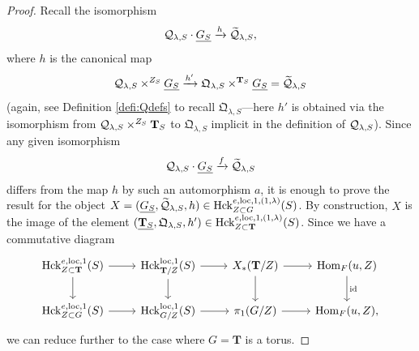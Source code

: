 \begin{proof}
Recall the isomorphism 
\begin{equation*}
    \mathcal{Q}_{\lambda,S} \cdot \underline{G_{S}} \xrightarrow{h} \widetilde{\mathcal{Q}}_{\lambda,S},
\end{equation*}
where $h$ is the canonical map 
\begin{equation*}
     \mathcal{Q}_{\lambda,S} \times^{Z_{S}} \underline{G_{S}} \xrightarrow{h'} \mathfrak{Q}_{\lambda,S} \times^{\mathbf{T}_{S}} \underline{G_{S}} = \widetilde{\mathcal{Q}}_{\lambda,S}
\end{equation*}
(again, see Definition \ref{defi:Qdefs} to recall $\mathfrak{Q}_{\lambda,S}$---here $h'$ is obtained via the isomorphism from $\mathcal{Q}_{\lambda,S} \times^{Z_{S}} \mathbf{T}_{S}$ to $\mathfrak{Q}_{\lambda,S}$ implicit in the definition of $\mathcal{Q}_{\lambda,S}$). Since any given isomorphism
\begin{equation*}
    \mathcal{Q}_{\lambda,S} \cdot \underline{G_{S}} \xrightarrow{f} \widetilde{\mathcal{Q}}_{\lambda,S}
\end{equation*}
differs from the map $h$ by such an automorphism $a$, it is enough to prove the result for the object $X =(\underline{G_{S}},\widetilde{\mathcal{Q}}_{\lambda,S},h) \in \mathrm{Hck}_{Z \subset G}^{e,\mathrm{loc},1,(1,\lambda)}(S)$. By construction, $X$ is the image of the element $(\underline{\mathbf{T}_{S}}, \mathfrak{Q}_{\lambda,S},h') \in \mathrm{Hck}_{Z \subset \mathbf{T}}^{e,\mathrm{loc},1,(1,\lambda)}(S)$. Since we have a commutative diagram
\[
\begin{tikzcd}
\Hck^{e,\loc,1}_{Z \subset \mathbf{T}}(S) \arrow{r} \arrow{d} & \Hck_{\mathbf{T}/Z}^{\loc,1}(S) \arrow{r} \arrow{d} & X_{*}(\mathbf{T}/Z) \arrow{r} \arrow{d} & \Hom_{F}(u,Z) \arrow["\tn{id}"]{d} \\
\Hck_{Z \subset G}^{e,\loc,1}(S) \arrow{r} & \Hck_{G/Z}^{\loc,1}(S) \arrow{r}  &  \pi_{1}(G/Z)\arrow{r} & \Hom_{F}(u,Z),
\end{tikzcd}
\]
we can reduce further to the case where $G=\mathbf{T}$ is a torus.


\end{proof}
